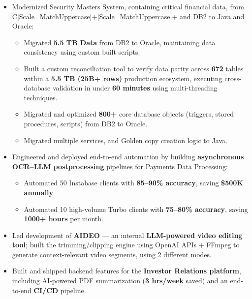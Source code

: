 \documentclass[a4paper,10pt]{article}
\newcommand{\asciplus}{{\fontspec{DejaVu Sans}[Scale=MatchUppercase]+}}
\newcommand{\Cpp}{C\asciplus\asciplus}
\newenvironment{zitemize}{
\begin{itemize}\itemsep0pt \parskip0pt \parsep1pt}
{\end{itemize}\vspace{-0.7cm}}
\begin{document}
\begin{zitemize}
\item Modernized Security Masters System, containing critical financial data, from \Cpp{} and DB2 to Java and Oracle: \vspace{-2pt}
\begin{itemize}
    \setlength{\itemsep}{-1pt}
    \setlength{\parsep}{0pt}
    \setlength{\topsep}{10pt}
    \setlength{\partopsep}{0pt}
    \item[-] Migrated  \textbf{5.5 TB Data} from DB2 to Oracle, maintaining data consistency using custom built scripts.
    \item[-] Built a custom reconciliation tool to verify data parity across \textbf{672} tables within a \textbf{5.5 TB (25B+ rows)} production ecosystem, executing cross-database validation in under \textbf{60 minutes}  using multi-threading techniques.
    \item[-] Migrated and optimized \textbf{800+} core database objects (triggers, stored procedures, scripts) from DB2 to Oracle.
    \item[-] Migrated multiple services, and Golden copy creation logic to Java.
\end{itemize}


\item Engineered and deployed end-to-end automation by building \textbf{asynchronous OCR--LLM postprocessing} pipelines for Payments Data Processing: \vspace{-0.15cm}
\begin{itemize}
    \item[-] Automated 50 Instabase clients with \textbf{85--90\% accuracy}, saving \textbf{\$500K annually}  \vspace{-0.15cm}
    \item[-] Automated 10 high-volume Turbo clients with \textbf{75--80\% accuracy}, saving \textbf{1000+ hours} per month. \vspace{-0.10cm}
\end{itemize}

\item Led development of \textbf{AIDEO} — an internal \textbf{LLM-powered video editing tool}; built the trimming/clipping engine using OpenAI APIs + FFmpeg to generate context-relevant video segments, using 2 different modes.

\item Built and shipped backend features for the \textbf{Investor Relations platform}, including AI-powered PDF summarization (\textbf{3 hrs/week} saved) and an end-to-end \textbf{CI/CD} pipeline.


\end{zitemize}
\end{document}
